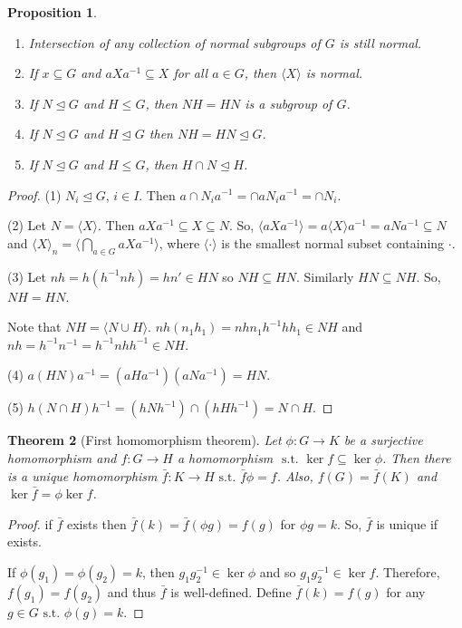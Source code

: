 \documentclass{amsart}
\newtheorem{thm}{Theorem}[section]
\newtheorem{prop}[thm]{Proposition}
\theoremstyle{definition}
\newcommand{\st}{\text{ s.t. }}
\begin{document}
\begin{prop}
	\begin{enumerate}
		\item Intersection of any collection of normal subgroups of $G$ is still normal.
		\item If $x\subseteq G$ and $aXa^{-1}\subseteq X$ for all $a\in G$, then $\langle X\rangle$ is normal.
		\item If $N\unlhd G$ and $H\leq G$, then $NH=HN$ is a subgroup of $G$.
		\item If $N\unlhd G$ and $H\unlhd G$ then $NH=HN\unlhd G$.
		\item If $N\unlhd G$ and $H\leq G$, then $H\cap N\unlhd H$.
	\end{enumerate}
\end{prop}
\begin{proof}
	(1) $N_i\unlhd G$, $i\in I$. Then $a\cap N_ia^{-1}=\cap aN_ia^{-1}=\cap N_i$.
	
	(2) Let $N=\langle X\rangle$. Then $aXa^{-1}\subseteq X\subseteq N$. So, $\langle aXa^{-1}\rangle=a\langle X\rangle a^{-1}=aNa^{-1}\subseteq N$ and $\langle X\rangle_n=\langle \bigcap\limits_{a\in G}aXa^{-1}\rangle$, where $\langle \cdot\rangle$ is the smallest normal subset containing $\cdot$.
	
	(3) Let $nh=h(h^{-1}nh)=hn'\in HN$ so $NH\subseteq HN$. Similarly $HN\subseteq NH$. So, $NH=HN$.
	
	Note that $NH=\langle N\cup H\rangle$. $nh(n_1h_1)=nhn_1h^{-1}hh_1\in NH$ and $nh=h^{-1}n^{-1}=h^{-1}nhh^{-1}\in NH$.
	
	(4) $a(HN)a^{-1}=(aHa^{-1})(aNa^{-1})=HN$.
	
	(5) $h(N\cap H)h^{-1}=(hNh^{-1})\cap (hHh^{-1})=N\cap H$.
\end{proof}
\begin{thm}[First homomorphism theorem]
Let $\phi:G\to K$ be a surjective homomorphism and $f:G\to H$ a homomorphism $\st\ker f\subseteq \ker \phi$. Then there is a unique homomorphism $\bar f:K\to H\st \bar f\phi=f$. Also, $f(G)=\bar f(K)$ and $\ker\bar f=\phi\ker f$. 
\end{thm}
\begin{proof}
if $\bar f$ exists then $\bar f(k)=\bar f(\phi g)=f(g)$ for $\phi g=k$. So, $\bar f$ is unique if exists.

If $\phi(g_1)=\phi(g_2)=k$, then $g_1g_2^{-1}\in\ker\phi$ and so $g_1g_2^{-1}\in\ker f$. Therefore, $f(g_1)=f(g_2)$ and thus $\bar f$ is well-defined. Define $\bar f(k)=f(g)$ for any $g\in G\st \phi(g)=k$.	
\end{proof}
\end{document}
